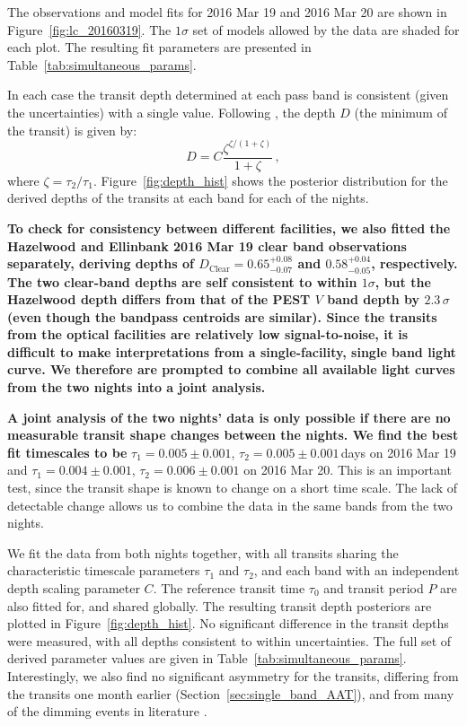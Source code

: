 \documentclass[useAMS,usenatbib]{mn2e}
\begin{document}
The observations and model fits for 2016 Mar 19 and 2016 Mar 20 are shown in Figure~\ref{fig:lc_20160319}. The $1\sigma$ set of models allowed by the data are shaded for each plot. The resulting fit parameters are presented in Table~\ref{tab:simultaneous_params}. 

In each case the transit depth determined at each pass band is consistent (given the uncertainties) with a single value. Following \citet{2015arXiv151006434C}, the depth $D$ (the minimum of the transit) is given by: 
\begin{equation}
D = C \frac{\zeta^{\zeta/(1+\zeta)} }{1+\zeta}\,,
\end{equation}
where $\zeta = \tau_2/\tau_1$. Figure~\ref{fig:depth_hist} shows the posterior distribution for the derived depths of the transits at each band for each of the nights. 

\textbf{To check for consistency between different facilities, we also fitted the Hazelwood and Ellinbank 2016 Mar 19 clear band observations separately, deriving depths of $D_\mathrm{Clear} = 0.65_{-0.07}^{+0.08}$ and $0.58_{-0.05}^{+0.04}$, respectively. The two clear-band depths are self consistent to within $1\sigma$, but the Hazelwood depth differs from that of the PEST $V$ band depth by $2.3\,\sigma$ (even though the bandpass centroids are similar). Since the transits from the optical facilities are relatively low signal-to-noise, it is difficult to make interpretations from a single-facility, single band light curve. We therefore are prompted to combine all available light curves from the two nights into a joint analysis. }

\textbf{A joint analysis of the two nights' data is only possible if there are no measurable transit shape changes between the nights. We find the best fit timescales to be} $\tau_1 = 0.005\pm0.001$, $\tau_2 = 0.005\pm0.001$\,days on 2016 Mar 19 and $\tau_1 = 0.004\pm0.001$, $\tau_2 = 0.006\pm0.001$ on 2016 Mar 20. This is an important test, since the transit shape is known to change on a short time scale. The lack of detectable change allows us to combine the data in the same bands from the two nights. 


We fit the data from both nights together, with all transits sharing the characteristic timescale parameters $\tau_1$ and $\tau_2$, and each band with an independent depth scaling parameter $C$. The reference transit time $\tau_0$ and transit period $P$ are also fitted for, and shared globally. The resulting transit depth posteriors are plotted in Figure~\ref{fig:depth_hist}. No significant difference in the transit depths were measured, with all depths consistent to within uncertainties. The full set of derived parameter values are given in Table~\ref{tab:simultaneous_params}. Interestingly, we also find no significant asymmetry for the transits, differing from the transits one month earlier (Section~\ref{sec:single_band_AAT}), and from many of the dimming events in literature \citep[e.g. FLWO transits from ][]{2015Natur.526..546V}. 
\end{document}
